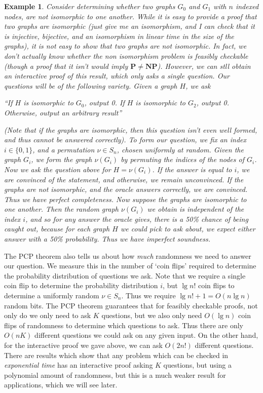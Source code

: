 \documentclass{article}
\theoremstyle{plain}
\newtheorem*{example}{Example}
\theoremstyle{definition}
\begin{document}
\begin{example}
    Consider determining whether two graphs $G_0$ and $G_1$ with $n$ indexed nodes, are {\it not} isomorphic to one another. While it is easy to provide a proof that two graphs are isomorphic (just give me an isomorphism, and I can check that it is injective, bijective, and an isomorphism in linear time in the size of the graphs), it is {\it not} easy to show that two graphs are not isomorphic. In fact, we don't actually know whether the non isomorphism problem is feasibly checkable (though a proof that it isn't would imply $\mathbf{P} \neq \mathbf{NP}$). However, we can stll obtain an interactive proof of this result, which only asks a single question. Our questions will be of the following variety. Given a graph $H$, we ask
    \begin{center} ``If $H$ is isomorphic to $G_0$, output 0. If $H$ is isomorphic to $G_2$, output 0. Otherwise, output an arbitrary result'' \end{center}
    (Note that if the graphs are isomorphic, then this question isn't even well formed, and thus cannot be answered correctly). To form our question, we fix an index $i \in \{ 0, 1 \}$, and a permutation $\nu \in S_n$, chosen uniformly at random. Given the graph $G_i$, we form the graph $\nu(G_i)$ by permuting the indices of the nodes of $G_i$. Now we ask the question above for $H = \nu(G_i)$. If the answer is equal to $i$, we are convinced of the statement, and otherwise, we remain unconvinced. If the graphs are not isomorphic, and the oracle answers correctly, we are convinced. Thus we have perfect completeness. Now suppose the graphs are isomorphic to one another. Then the random graph $\nu(G_i)$ we obtain is independent of the index $i$, and so for any answer the oracle gives, there is a 50\% chance of being caught out, because for each graph $H$ we could pick to ask about, we expect either answer with a 50\% probability. Thus we have imperfect soundness.
\end{example}

The PCP theorem also tells us about how {\it much} randomness we need to answer our question. We measure this in the number of `coin flips' required to determine the probability distribution of questions we ask. Note that we require a single coin flip to determine the probability distribution $i$, but $\lg n!$ coin flips to determine a uniformly random $\nu \in S_n$. Thus we require $\lg n! + 1 = O(n \lg n)$ random bits. The PCP theorem guarantees that for feasibly checkable proofs, not only do we only need to ask $K$ questions, but we also only need $O(\lg n)$ coin flips of randomness to determine which questions to ask. Thus there are only $O(nK)$ different questions we could ask on any given input. On the other hand, for the interactive proof we gave above, we can ask $O(2n!)$ different questions. There are results which show that any problem which can be checked in {\it exponential time} has an interactive proof asking $K$ questions, but using a polynomial amount of randomness, but this is a much weaker result for applications, which we will see later.
\end{document}
